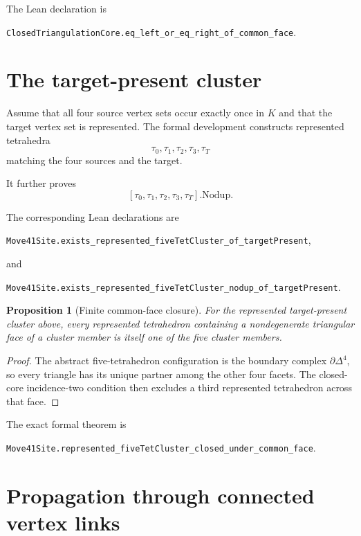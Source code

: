 \documentclass[11pt]{article}
\newtheorem{proposition}[theorem]{Proposition}
\theoremstyle{definition}
\theoremstyle{remark}
\begin{document}
The Lean declaration is
\begin{center}
\texttt{\small ClosedTriangulationCore.eq\_left\_or\_eq\_right\_of\_common\_face}.
\end{center}

\section{The target-present cluster}

Assume that all four source vertex sets occur exactly once in $K$ and that
the target vertex set is represented.  The formal development constructs
represented tetrahedra
\[
  \tau_0,\tau_1,\tau_2,\tau_3,\tau_T
\]
matching the four sources and the target.

It further proves
\[
  [\tau_0,\tau_1,\tau_2,\tau_3,\tau_T].\mathrm{Nodup}.
\]

The corresponding Lean declarations are
\begin{center}
\texttt{\small Move41Site.exists\_represented\_fiveTetCluster\_of\_targetPresent},
\end{center}
and
\begin{center}
\texttt{\small Move41Site.exists\_represented\_fiveTetCluster\_nodup\_of\_targetPresent}.
\end{center}

\begin{proposition}[Finite common-face closure]
For the represented target-present cluster above, every represented
tetrahedron containing a nondegenerate triangular face of a cluster member
is itself one of the five cluster members.
\end{proposition}

\begin{proof}
The abstract five-tetrahedron configuration is the boundary complex
$\partial\Delta^4$, so every triangle has its unique partner among the
other four facets.  The closed-core incidence-two condition then excludes a
third represented tetrahedron across that face.
\end{proof}

The exact formal theorem is
\begin{center}
\texttt{\small Move41Site.represented\_fiveTetCluster\_closed\_under\_common\_face}.
\end{center}

\section{Propagation through connected vertex links}
\end{document}

